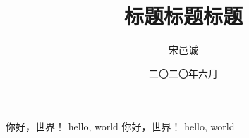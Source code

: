 \documentclass[a4paper, 12pt, fontset=windows]{HBUThesis}
\date{二〇二〇年六月}
\title{标题标题标题}
\author{宋邑诚}
\begin{document}
\makecover
\makeEncover
\orgState

你好，世界！
hello, world
\newpage
你好，世界！
hello, world
\end{document}
